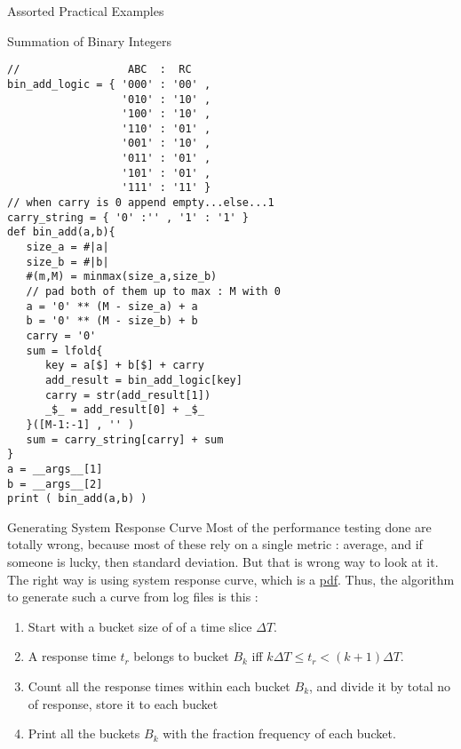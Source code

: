 \begin{section}{Assorted Practical Examples}
\begin{subsection}{Summation of Binary Integers}
\begin{center}\begin{minipage}{\linewidth}
\begin{lstlisting}[style=JexlStyle]
//                 ABC  :  RC
bin_add_logic = { '000' : '00' ,
                  '010' : '10' ,
                  '100' : '10' ,
                  '110' : '01' ,
                  '001' : '10' ,
                  '011' : '01' ,
                  '101' : '01' ,
                  '111' : '11' }
// when carry is 0 append empty...else...1
carry_string = { '0' :'' , '1' : '1' } 
def bin_add(a,b){
   size_a = #|a|
   size_b = #|b|
   #(m,M) = minmax(size_a,size_b)
   // pad both of them up to max : M with 0
   a = '0' ** (M - size_a) + a
   b = '0' ** (M - size_b) + b
   carry = '0'
   sum = lfold{
      key = a[$] + b[$] + carry
      add_result = bin_add_logic[key]
      carry = str(add_result[1])
      _$_ = add_result[0] + _$_ 
   }([M-1:-1] , '' )
   sum = carry_string[carry] + sum 
}
a = __args__[1]
b = __args__[2]
print ( bin_add(a,b) )
\end{lstlisting}  
\end{minipage}\end{center}


\end{subsection}

\begin{subsection}{Generating System Response Curve}
Most of the performance testing done are totally wrong, because 
most of these rely on a single metric : average, and if someone is lucky, 
then standard deviation. But that is wrong way to look at it.
The right way is using system response curve, which is a 
\href{https://en.wikipedia.org/wiki/Probability\_distribution\_function}{pdf}.
Thus, the algorithm to generate such a curve from log files is this :

\begin{enumerate}
\item{Start with a bucket size of of a time slice $\Delta T$. }
\item{A response time $t_r$ belongs to bucket $B_k$ iff $  k \Delta T \le  t_r < (k+1) \Delta T  $. }
\item{Count all the response times within each bucket $B_k$, and divide it by total no of response, store it to each bucket }
\item{Print all the buckets $B_k$ with the fraction frequency of each bucket. }
\end{enumerate}


\end{subsection}
\end{section}

